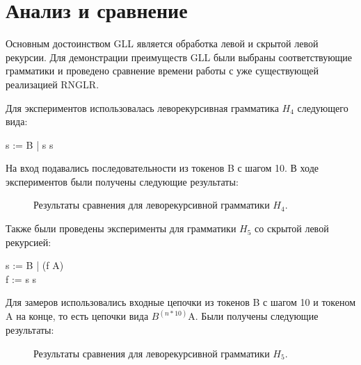 \documentclass{matmex-diploma-custom}
\begin{document}
\section{Анализ и сравнение}
Основным достоинством GLL является обработка левой и скрытой левой рекурсии. Для демонстрации преимуществ GLL были выбраны соответствующие грамматики и проведено сравнение времени работы с уже существующей реализацией RNGLR. 

Для экспериментов использовалась леворекурсивная грамматика $H_4$ следующего вида:
\begin{center}
    s := B | s s
\end{center}

На вход подавались последовательности из токенов B с шагом 10. В ходе экспериментов были получены следующие результаты:

\begin{figure}[h]
\caption{Результаты сравнения для леворекурсивной грамматики $H_4$.}
\label{fig11}
\end{figure}

Также были проведены эксперименты для грамматики $H_5$ со скрытой левой рекурсией:
\begin{center}
    s := B | (f A)
    \\f := s s
\end{center}
	
Для замеров использовались входные цепочки из токенов B с шагом 10 и токеном A на конце, то есть цепочки вида $B^(n*10)$A. Были получены следующие результаты:

\begin{figure}[h]
\caption{Результаты сравнения для леворекурсивной грамматики $H_5$.}
\label{fig12}
\end{figure}
\end{document}
